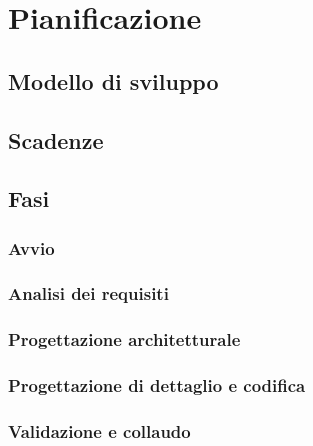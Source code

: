 \section{Pianificazione}

\subsection{Modello di sviluppo}




\subsection{Scadenze}





\subsection{Fasi}

\subsubsection{Avvio}



\subsubsection{Analisi dei requisiti}



\subsubsection{Progettazione architetturale}



\subsubsection{Progettazione di dettaglio e codifica}



\subsubsection{Validazione e collaudo}



